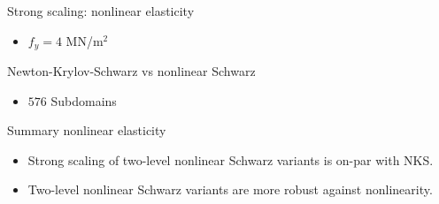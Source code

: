 \begin{frame}{Strong scaling: nonlinear elasticity}
	\begin{itemize}
		\item $f_y = 4$ MN/m$^{2}$
	\end{itemize}
	\begin{figure}
		\centering
		
		\label{fig:strong-scalability-elascticity}
	\end{figure}
\end{frame}

\begin{frame}{Newton-Krylov-Schwarz vs nonlinear Schwarz}
	\begin{itemize}
		\item $576$ Subdomains
	\end{itemize}
	\begin{figure}
		\centering
		
		\label{fig:nks-vs-nls}
	\end{figure}
\end{frame}

 \begin{frame}{Summary nonlinear elasticity}
   \begin{itemize}
     \item Strong scaling of two-level nonlinear Schwarz variants is on-par with NKS.
     \item Two-level nonlinear Schwarz variants are more robust against nonlinearity.
   \end{itemize}
 \end{frame}
